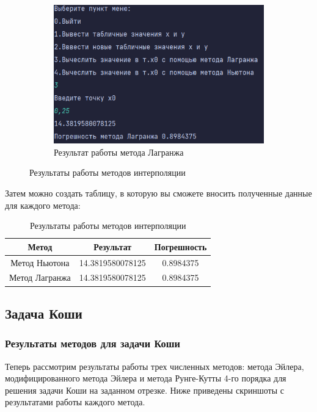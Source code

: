 \documentclass[12pt]{article}
\begin{document}
\begin{figure}[ht]
\hfill
\begin{subfigure}{0.4\textwidth}
\includegraphics[width=\linewidth]{method_interpolation_Lagrange.png}
\caption{Результат работы метода Лагранжа}
\end{subfigure}
\caption{Результаты работы методов интерполяции}
\end{figure}

Затем можно создать таблицу, в которую вы сможете вносить полученные данные для каждого метода:

\begin{table}[ht]
\centering
\begin{tabular}{|c|c|c|}
\hline
\textbf{Метод} & \textbf{Результат} & \textbf{Погрешность} \\
\hline
Метод Ньютона & 14.3819580078125 & 0.8984375 \\
\hline
Метод Лагранжа & 14.3819580078125 & 0.8984375 \\
\hline
\end{tabular}
\caption{Результаты работы методов интерполяции}
\end{table}

\subsection{Задача Коши}
\subsubsection{Результаты методов для задачи Коши}

Теперь рассмотрим результаты работы трех численных методов: метода Эйлера, модифицированного метода Эйлера и метода Рунге-Кутты 4-го порядка для решения задачи Коши на заданном отрезке. Ниже приведены скриншоты с результатами работы каждого метода.
\end{document}
